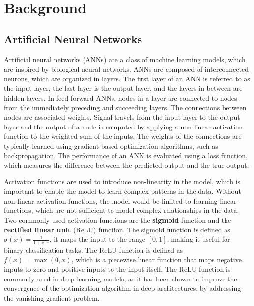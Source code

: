 \chapter{Background}
\label{chap:background}

\section{Artificial Neural Networks}

Artificial neural networks (ANNs) are a class of machine learning models, which are inspired by biological neural networks. ANNs are composed of interconnected
neurons, which are organized in layers. The first layer of an ANN is referred to as the input layer, the last layer is the output layer, and the layers
in between are hidden layers. In feed-forward ANNs, nodes in a layer are connected to nodes from the immediately preceding and succeeding layers. The connections between nodes
are associated weights.  Signal travels from the input layer to the output layer and the output of a node is computed by applying a non-linear activation function
to the weighted sum of the inputs. The weights of the connections are typically learned using gradient-based optimization algorithms, such as backpropagation.
The performance of an ANN is evaluated using a loss function, which measures the difference between the predicted output and the true output.


Activation functions are used to introduce non-linearity in the model, which is important to enable the model to learn complex patterns in the data. Without
non-linear activation functions, the model would be limited to learning linear functions, which are not sufficient to model complex relationships in the data.
Two commonly used activation functions are the \textbf{sigmoid} function and the \textbf{rectified linear unit} (ReLU) function. The sigmoid function is defined as
$\sigma(x) = \frac{1}{1 + e^{-x}}$, it maps the input to the range $[0, 1]$, making it useful for binary classification tasks. The ReLU function is defined as
$f(x) = \max(0, x)$, which is a piecewise linear function that maps negative inputs to zero and positive inputs to the input itself. The ReLU function is
commonly used in deep learning models, as it has been shown to improve the convergence of the optimization algorithm in deep architectures, by addressing the
vanishing gradient problem.


